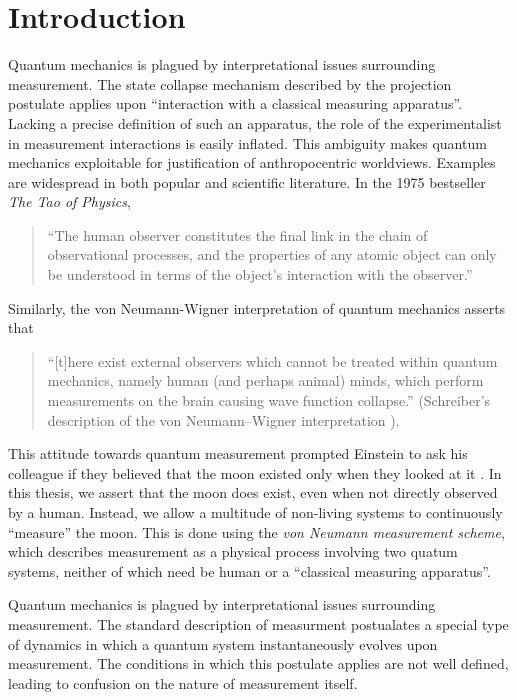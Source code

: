 \chapter{Introduction}

Quantum mechanics is plagued by interpretational issues surrounding measurement. The state collapse mechanism described by the projection postulate applies upon ``interaction with a classical measuring apparatus''. Lacking a precise definition of such an apparatus, the role of the experimentalist in measurement interactions is  easily inflated. This ambiguity makes quantum mechanics exploitable for justification of anthropocentric worldviews. Examples are widespread in both popular and scientific literature. In the 1975 bestseller \textit{The Tao of Physics},
\begin{quote}
  ``The human observer constitutes the final link in the chain of observational processes, and the properties of any atomic object can only be understood in terms of the object's interaction with the observer.'' \cite{Capra}
\end{quote}
Similarly, the von Neumann-Wigner interpretation of quantum mechanics asserts that
\begin{quote}
  ``[t]here exist external observers which cannot be treated within quantum mechanics, namely human (and perhaps animal) minds, which perform measurements on the brain causing wave function collapse.'' (Schreiber's description of the von Neumann–Wigner interpretation \cite{Schreiber}).
\end{quote}

This attitude towards quantum measurement prompted Einstein to ask his colleague if they believed that the moon existed only when they looked at it \cite{Pais}. In this thesis, we assert that the moon does exist, even when not directly observed by a human. Instead, we allow a multitude of non-living systems to continuously ``measure'' the moon. This is done using the \textit{von Neumann measurement scheme}, which describes measurement as a physical process involving two quatum systems, neither of which need be human or a ``classical measuring apparatus''.

Quantum mechanics is plagued by interpretational issues surrounding measurement. The
standard description of measurment postualates a special type of dynamics in which a quantum system instantaneously evolves upon measurement. The conditions in which this postulate applies are not well defined, leading to confusion on the nature of measurement itself.

